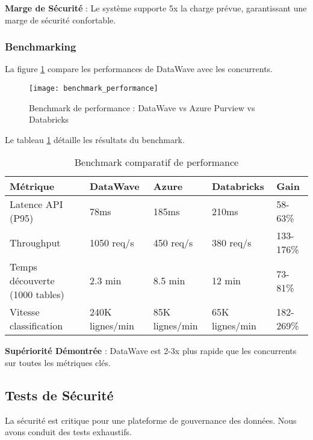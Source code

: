 \textbf{Marge de Sécurité} : Le système supporte 5x la charge prévue, garantissant une marge de sécurité confortable.

\subsubsection{Benchmarking}

La figure \ref{fig:benchmark_performance} compare les performances de DataWave avec les concurrents.

\begin{figure}[htpb]
\centering
\texttt{[image: benchmark\_performance]}
\caption{Benchmark de performance : DataWave vs Azure Purview vs Databricks}
\label{fig:benchmark_performance}
\end{figure}

Le tableau \ref{tab:benchmark_comparatif} détaille les résultats du benchmark.

\begin{table}[htpb]
\centering
\caption{Benchmark comparatif de performance}
\label{tab:benchmark_comparatif}
\begin{tabular}{|p{}|p{}|p{}|p{}|p{}|}
\hline
\textbf{Métrique} & \textbf{DataWave} & \textbf{Azure} & \textbf{Databricks} & \textbf{Gain} \\
\hline
Latence API (P95) & 78ms & 185ms & 210ms & 58-63\% \\
\hline
Throughput & 1050 req/s & 450 req/s & 380 req/s & 133-176\% \\
\hline
Temps découverte (1000 tables) & 2.3 min & 8.5 min & 12 min & 73-81\% \\
\hline
Vitesse classification & 240K lignes/min & 85K lignes/min & 65K lignes/min & 182-269\% \\
\hline
\end{tabular}
\end{table}

\textbf{Supériorité Démontrée} : DataWave est 2-3x plus rapide que les concurrents sur toutes les métriques clés.

\subsection{Tests de Sécurité}

La sécurité est critique pour une plateforme de gouvernance des données. Nous avons conduit des tests exhaustifs.

